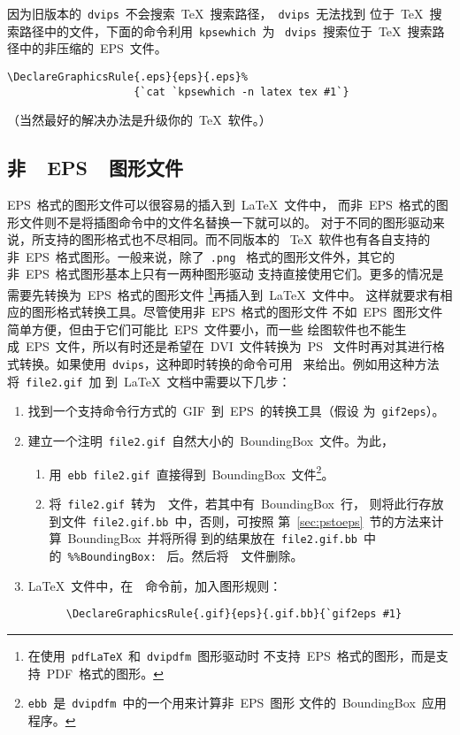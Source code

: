 因为旧版本的~\texttt{dvips}~不会搜索~\TeX{}~搜索路径，~\texttt{dvips}~无法找到
位于~\TeX{}~搜索路径中的文件，下面的命令利用~\texttt{kpsewhich}~为
~\texttt{dvips}~搜索位于~\TeX{}~搜索路径中的非压缩的~EPS~文件。
\begin{Verbatim}[xleftmargin=1cm]
\DeclareGraphicsRule{.eps}{eps}{.eps}%
                    {`cat `kpsewhich -n latex tex #1`}
\end{Verbatim}
（当然最好的解决办法是升级你的~\TeX{}~软件。）

\subsection{非~~EPS~~图形文件}\label{ssec:noneps}

EPS~格式的图形文件可以很容易的插入到~\LaTeX{}~文件中，
而非~EPS~格式的图形文件则不是将插图命令中的文件名替换一下就可以的。
对于不同的图形驱动来说，所支持的图形格式也不尽相同。而不同版本的
~\TeX{}~软件也有各自支持的非~EPS~格式图形。一般来说，除了~\texttt{.png}~
格式的图形文件外，其它的非~EPS~格式图形基本上只有一两种图形驱动
支持直接使用它们。更多的情况是需要先转换为~EPS~格式的图形文件
\footnote{在使用~\texttt{pdf\LaTeX}~和~\texttt{dvipdfm}~图形驱动时
不支持~EPS~格式的图形，而是支持~PDF~格式的图形。}再插入到~\LaTeX{}~文件中。
这样就要求有相应的图形格式转换工具。尽管使用非~EPS~格式的图形文件
不如~EPS~图形文件简单方便，但由于它们可能比~EPS~文件要小，而一些
绘图软件也不能生成~EPS~文件，所以有时还是希望在~DVI~文件转换为~PS~
文件时再对其进行格式转换。如果使用~\texttt{dvips}，这种即时转换的命令可用
~来给出。例如用这种方法将~\texttt{file2.gif}~加
到~\LaTeX{}~文档中需要以下几步：

\begin{enumerate}
\item 找到一个支持命令行方式的~GIF~到~EPS~的转换工具（假设
      为~\texttt{gif2eps}）。
\item 建立一个注明~\texttt{file2.gif}~自然大小的~BoundingBox~文件。为此，
      \begin{enumerate}
      \item 用~\texttt{ebb file2.gif}~直接得到~BoundingBox~文件\footnote{
            \texttt{ebb}~是~\texttt{dvipdfm}~中的一个用来计算非~EPS~图形
            文件的~BoundingBox~应用程序。}。
      \item 将~\texttt{file2.gif}~转为~\PS~文件，若其中有~BoundingBox~行，
            则将此行存放到文件~\texttt{file2.gif.bb}~中，否则，可按照
            第~\ref{sec:pstoeps}~节的方法来计算~BoundingBox~并将所得
            到的结果放在~\texttt{file2.gif.bb}~中的~\texttt{\%\%BoundingBox:}~
            后。然后将~\PS~文件删除。
      \end{enumerate}
\item \LaTeX{}~文件中，在~~命令前，加入图形规则：
      \begin{Verbatim}
      \DeclareGraphicsRule{.gif}{eps}{.gif.bb}{`gif2eps #1}
      \end{Verbatim}
\end{enumerate}

